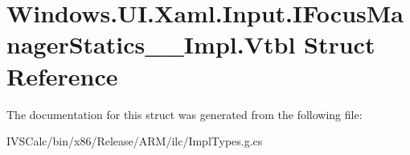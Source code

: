 \hypertarget{struct_windows_1_1_u_i_1_1_xaml_1_1_input_1_1_i_focus_manager_statics_____impl_1_1_vtbl}{}\section{Windows.\+U\+I.\+Xaml.\+Input.\+I\+Focus\+Manager\+Statics\+\_\+\+\_\+\+Impl.\+Vtbl Struct Reference}
\label{struct_windows_1_1_u_i_1_1_xaml_1_1_input_1_1_i_focus_manager_statics_____impl_1_1_vtbl}


The documentation for this struct was generated from the following file\+:\begin{DoxyCompactItemize}
\item 
I\+V\+S\+Calc/bin/x86/\+Release/\+A\+R\+M/ilc/Impl\+Types.\+g.\+cs\end{DoxyCompactItemize}
